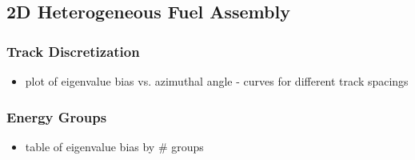 \subsection{2D Heterogeneous Fuel Assembly}

\subsubsection{Track Discretization}
\label{subsubsec:chap4-hetero-lattice-tracks}

\begin{itemize}[noitemsep]
  \item plot of eigenvalue bias vs. azimuthal angle - curves for different track spacings
\end{itemize}

\subsubsection{Energy Groups}
\label{subsubsec:chap4-hetero-lattice-energy}

\begin{itemize}[noitemsep]
  \item table of eigenvalue bias by \# groups
\end{itemize}
